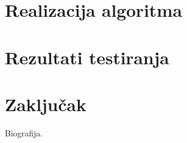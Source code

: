 \documentclass[12pt,oneside]{memoir}
\theoremstyle{definition}
\begin{document}
\chapter{Realizacija algoritma}

\chapter{Rezultati testiranja}

\chapter{Zaključak}

\literatura

\backmatter

\begin{biografija}
	Biografija.
\end{biografija}
\end{document}
